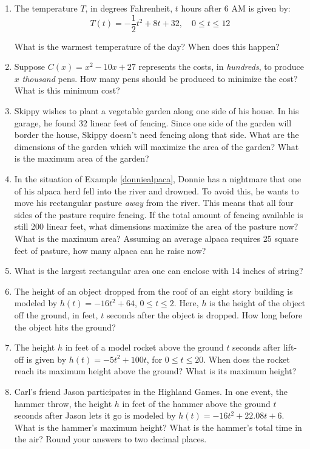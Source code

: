 \begin{enumerate}
\item  The temperature $T$, in degrees Fahrenheit, $t$ hours after 6 AM is given by: \[ T(t) = -\frac{1}{2} t^2 + 8t+32, \quad 0 \leq t \leq 12\]

What is the warmest temperature of the day?  When does this happen?

\item  Suppose $C(x) = x^2-10x+27$ represents the costs, in \textit{hundreds}, to produce $x$ \textit{thousand} pens.  How many pens should be produced to minimize the cost?  What is this minimum cost?

\item \label{fixedperimetermaxareagarden} Skippy wishes to plant a vegetable garden along one side of his house.  In his garage, he found 32 linear feet of fencing.  Since one side of the garden will border the house, Skippy doesn't need fencing along that side.  What are the dimensions of the garden which will maximize the area of the garden?  What is the maximum  area of the garden?

\item In the situation of Example \ref{donniealpaca}, Donnie has a nightmare that one of his alpaca herd fell into the river and drowned.  To avoid this, he wants to move his rectangular pasture \textit{away} from the river.  This means that all four sides of the pasture require fencing.  If the total amount of fencing available is still 200 linear feet, what dimensions maximize the area of the pasture now?  What is the maximum area?  Assuming an average alpaca requires 25 square feet of pasture, how many alpaca can he raise now?

\item What is the largest rectangular area one can enclose with 14 inches of string?


\item  The height of an object dropped from the roof of an eight story building is modeled by  $h(t) = -16t^2 + 64$, $0 \leq t \leq 2$. Here,  $h$ is the height of the object off the ground, in feet, $t$ seconds after the object is dropped.  How long before the object hits the ground?

\item  The height $h$ in feet of a model rocket above the ground $t$ seconds after lift-off is given by $h(t) = -5t^2+100t$, for $0 \leq t \leq 20$.  When does the rocket reach its maximum height above the ground?  What is its maximum height?

\item  Carl's friend Jason participates in the Highland Games. In one event, the hammer throw, the height $h$ in feet of the hammer above the ground $t$ seconds after Jason lets it go is modeled by $h(t) = -16t^2 +  22.08t + 6$.  What is the hammer's maximum height?  What is the hammer's total time in the air? Round your answers to two decimal places.



\end{enumerate}
